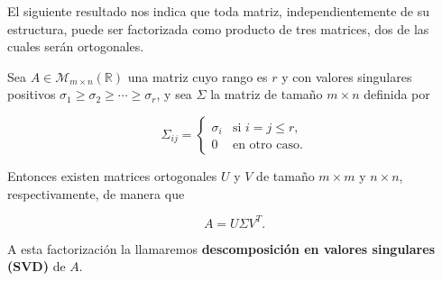 El siguiente resultado nos indica que toda matriz, independientemente de su estructura, puede ser factorizada como producto de tres matrices, dos de las cuales serán ortogonales.

\begin{teorema}
    Sea $A \in \mathcal{M}_{m \times n}(\mathbb{R})$ una matriz cuyo rango es $r$ y con valores singulares positivos $\sigma_{1} \geq \sigma_{2} \geq \cdots \geq \sigma_{r}$, y sea $\Sigma$ la matriz de tamaño $m \times n$ definida por 

    \[
        \Sigma_{ij} =
        \begin{cases}
            \sigma_i & \text{si } i = j \leq r, \\
            0 & \text{en otro caso.}
        \end{cases}
    \]

    Entonces existen matrices ortogonales $U$ y $V$ de tamaño $m\times m$ y $n\times n$, respectivamente, de manera que

    \[
        A = U \Sigma V^{T}.
    \]

    A esta factorización la llamaremos \textbf{descomposición en valores singulares (SVD)} de $A$.
\end{teorema}

